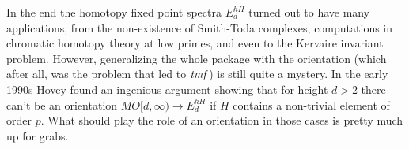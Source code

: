In the end the homotopy fixed point spectra $E_{d}^{hH}$ turned out to
have many applications, from the non-existence of Smith-Toda
complexes, computations in chromatic homotopy theory at low primes, and
even to the Kervaire invariant problem.  However, generalizing the whole
package with the orientation (which after all, was the problem that
led to $\mathit{tmf}$) is still quite a mystery.  In the early
1990s Hovey found an ingenious argument showing that for height $d>2$
there can't be an orientation $MO[d, \infty) \to E^{hH}_{d}$ if $H$ contains
a non-trivial element of order $p$.  What should play the role of an
orientation in those cases is pretty much up for grabs.
